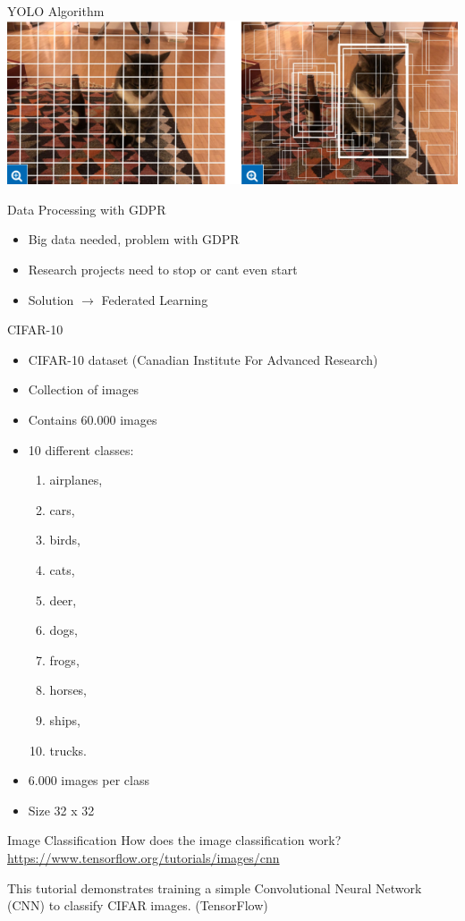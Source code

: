 \documentclass{beamer}{}
\begin{document}
    \begin{frame} {YOLO Algorithm}
        \center\includegraphics[width=\textwidth]{img/5.png}
    \end{frame}
    \begin{frame} {Data Processing with GDPR}
        \begin{itemize}[<+->]
           \item Big data needed, problem with GDPR
           \item Research projects need to stop or cant even start
           \item Solution $\rightarrow$ Federated Learning
        \end{itemize}        
    \end{frame}
    \begin{frame} {CIFAR-10}
        \begin{itemize}
            \item<+-> CIFAR-10 dataset (Canadian Institute For Advanced Research)
            \item<+-> Collection of images
            \item<+-> Contains 60.000 images
            \item<+-> 10 different classes: 
                \begin{enumerate}
                    \item airplanes,
                    \item cars,
                    \item birds,
                    \item cats,
                    \item deer,
                    \item dogs,
                    \item frogs,
                    \item horses,
                    \item ships,
                    \item trucks.
                \end{enumerate}
            \item<+-> 6.000 images per class
            \item<+-> Size 32 x 32
        \end{itemize}
    \end{frame}
\begin{frame} {Image Classification}
How does the image classification work?
\url{https://www.tensorflow.org/tutorials/images/cnn}

This tutorial demonstrates training a simple Convolutional Neural Network (CNN) to classify CIFAR images. (TensorFlow)
\end{frame}
\end{document}
